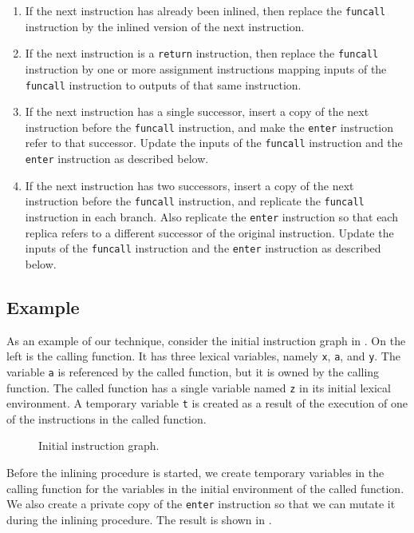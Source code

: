 \begin{enumerate}
\item If the next instruction has already been inlined, then replace
  the \texttt{funcall} instruction by the inlined version of the next
  instruction.
\item If the next instruction is a \texttt{return} instruction, then
  replace the \texttt{funcall} instruction by one or more assignment
  instructions mapping inputs of the \texttt{funcall} instruction to
  outputs of that same instruction.
\item If the next instruction has a single successor, insert a copy of
  the next instruction before the \texttt{funcall} instruction, and
  make the \texttt{enter} instruction refer to that successor.  Update
  the inputs of the \texttt{funcall} instruction and the \texttt{enter}
  instruction as described below.
\item If the next instruction has two successors, insert a copy of the
  next instruction before the \texttt{funcall} instruction, and
  replicate the \texttt{funcall} instruction in each branch.  Also
  replicate the \texttt{enter} instruction so that each replica refers
  to a different successor of the original instruction.  Update the
  inputs of the \texttt{funcall} instruction and the \texttt{enter}
  instruction as described below.
\end{enumerate}

\subsection{Example}

As an example of our technique, consider the initial instruction graph
in .  On the left is the calling function.  It has three
lexical variables, namely \texttt{x}, \texttt{a}, and \texttt{y}.  The
variable \texttt{a} is referenced by the called function, but it is
owned by the calling function.  The called function has a single
variable named \texttt{z} in its initial lexical environment.  A
temporary variable \texttt{t} is created as a result of the execution
of one of the instructions in the called function.

\begin{figure}
\begin{center}
\end{center}
\caption{\label{fig41}
Initial instruction graph.}
\end{figure}

Before the inlining procedure is started, we create temporary
variables in the calling function for the variables in the initial
environment of the called function.  We also create a private copy of
the \texttt{enter} instruction so that we can mutate it during the
inlining procedure.  The result is shown in .

